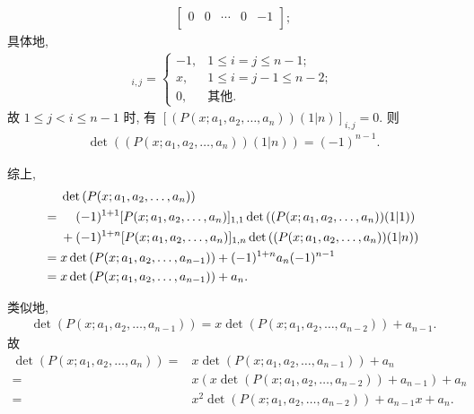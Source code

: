 \begin{example}
\begin{align*}
\begin{bmatrix}
              0      & 0      & \cdots & 0      & -1     \\
          \end{bmatrix};
    \end{align*}
    具体地,
    \begin{align*}
        [(P(x; a_1, a_2, \dots, a_n))(1|n)]_{i,j}
        = \begin{cases}
              -1, & 1 \leq i = j \leq n-1;     \\
              x,  & 1 \leq i = j - 1 \leq n-2; \\
              0,  & \text{其他}.
          \end{cases}
    \end{align*}
    故 \(1 \leq j < i \leq n-1\) 时, 有
    \([(P(x; a_1, a_2, \dots, a_n))(1|n)]_{i,j} = 0\).
    则
    \begin{align*}
        \det {((P(x; a_1, a_2, \dots, a_n))(1|n))}
        = (-1)^{n-1}.
    \end{align*}

    综上,
    \begin{align*}
             &
        \det {(P(x; a_1, a_2, \dots, a_n))}
        \\
        = {} &
        \hphantom{{} + {}}
        (-1)^{1+1} [P(x; a_1, a_2, \dots, a_n)]_{1,1}
        \det {((P(x; a_1, a_2, \dots, a_n))(1|1))}
        \\
             &
        + (-1)^{1+n} [P(x; a_1, a_2, \dots, a_n)]_{1,n}
        \det {((P(x; a_1, a_2, \dots, a_n))(1|n))}
        \\
        = {} &
        x \det {(P(x; a_1, a_2, \dots, a_{n-1}))}
        + (-1)^{1+n} a_n (-1)^{n-1}
        \\
        = {} &
        x \det {(P(x; a_1, a_2, \dots, a_{n-1}))} + a_n.
    \end{align*}

    类似地,
    \begin{align*}
        \det {(P(x; a_1, a_2, \dots, a_{n-1}))}
        = x \det {(P(x; a_1, a_2, \dots, a_{n-2}))} + a_{n-1}.
    \end{align*}
    故
    \begin{align*}
        \det {(P(x; a_1, a_2, \dots, a_n))}
        = {} &
        x \det {(P(x; a_1, a_2, \dots, a_{n-1}))} + a_n
        \\
        = {} &
        x (x \det {(P(x; a_1, a_2, \dots, a_{n-2}))} + a_{n-1}) + a_n
        \\
        = {} &
        x^2 \det {(P(x; a_1, a_2, \dots, a_{n-2}))}
        + a_{n-1} x + a_n.
    \end{align*}


\end{example}
